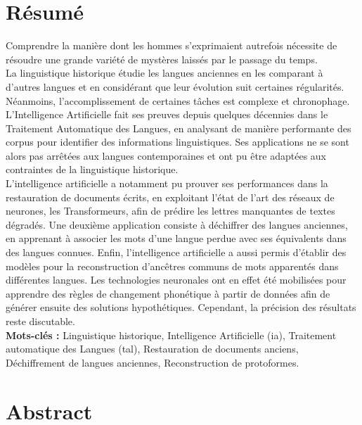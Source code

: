 \documentclass[12pt, twoside]{report}
\begin{document}
\null
\setcounter{page}{1}
\thispagestyle{empty}
\newpage %
\section*{Résumé}
Comprendre la manière dont les hommes s'exprimaient autrefois nécessite de résoudre une grande variété de mystères laissés par le passage du temps.\\ 

La linguistique historique étudie les langues anciennes en les comparant à d'autres langues et en considérant que leur évolution suit certaines régularités. Néanmoins, l'accomplissement de certaines tâches est complexe et chronophage.\\
\indent L'Intelligence Artificielle fait ses preuves depuis quelques décennies dans le Traitement Automatique des Langues, en analysant de manière performante des corpus pour identifier des informations linguistiques. Ses applications ne se sont alors pas arrêtées aux langues contemporaines et ont pu être adaptées aux contraintes de la linguistique historique.\\
\indent L'intelligence artificielle a notamment pu prouver ses performances dans la restauration de documents écrits, en exploitant l'état de l'art des réseaux de neurones, les Transformeurs, afin de prédire les lettres manquantes de textes dégradés. Une deuxième application consiste à déchiffrer des langues anciennes, en apprenant à associer les mots d'une langue perdue avec ses équivalents dans des langues connues. Enfin, l'intelligence artificielle a aussi permis d'établir des modèles pour la reconstruction d'ancêtres communs de mots apparentés dans différentes langues. Les technologies neuronales ont en effet été mobilisées pour apprendre des règles de changement phonétique à partir de données afin de générer ensuite des solutions hypothétiques. Cependant, la précision des résultats reste discutable.\\

\textbf{Mots-clés :} Linguistique historique, Intelligence Artificielle (\Gls{ia}), Traitement automatique des Langues (\Gls{tal}), Restauration de documents anciens, Déchiffrement de langues anciennes, Reconstruction de \glspl{protoforme}.

\section*{Abstract}
\end{document}
